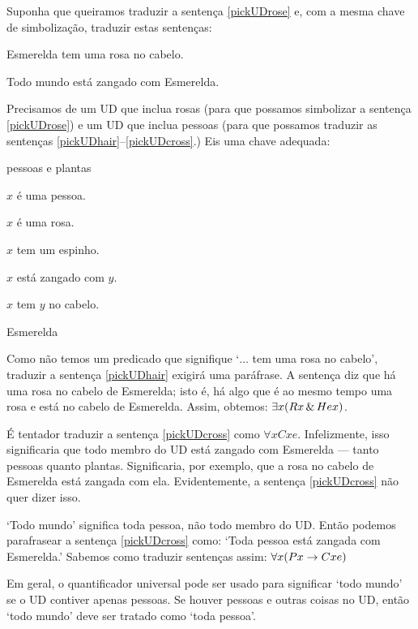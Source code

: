 Suponha que queiramos traduzir a sentença \ref{pickUDrose} e, com a mesma chave de simbolização, traduzir estas sentenças:

\begin{earg}
\item[\ex{pickUDhair}] Esmerelda tem uma rosa no cabelo.
\item[\ex{pickUDcross}] Todo mundo está zangado com Esmerelda.
\end{earg}

Precisamos de um UD que inclua rosas (para que possamos simbolizar a sentença \ref{pickUDrose}) e um UD que inclua pessoas (para que possamos traduzir as sentenças \ref{pickUDhair}--\ref{pickUDcross}.) Eis uma chave adequada:
\begin{ekey}
\item[UD:] pessoas e plantas
\item[Px:] $x$ é uma pessoa.
\item[Rx:] $x$ é uma rosa.
\item[Tx:] $x$ tem um espinho.
\item[Cxy:] $x$ está zangado com $y$.
\item[Hxy:] $x$ tem $y$ no cabelo.
\item[e:] Esmerelda
\end{ekey}

Como não temos um predicado que signifique `$\ldots$ tem uma rosa no cabelo', traduzir a sentença \ref{pickUDhair} exigirá uma paráfrase. A sentença diz que há uma rosa no cabelo de Esmerelda; isto é, há algo que é ao mesmo tempo uma rosa e está no cabelo de Esmerelda. Assim, obtemos: $\exists x(Rx \,\&\, Hex)$.

É tentador traduzir a sentença \ref{pickUDcross} como $\forall x Cxe$. Infelizmente, isso significaria que todo membro do UD está zangado com Esmerelda — tanto pessoas quanto plantas. Significaria, por exemplo, que a rosa no cabelo de Esmerelda está zangada com ela. Evidentemente, a sentença \ref{pickUDcross} não quer dizer isso.

`Todo mundo' significa toda pessoa, não todo membro do UD. Então podemos parafrasear a sentença \ref{pickUDcross} como: `Toda pessoa está zangada com Esmerelda.' Sabemos como traduzir sentenças assim: $\forall x(Px \rightarrow Cxe)$

Em geral, o quantificador universal pode ser usado para significar `todo mundo' se o UD contiver apenas pessoas. Se houver pessoas e outras coisas no UD, então `todo mundo' deve ser tratado como `toda pessoa'.


